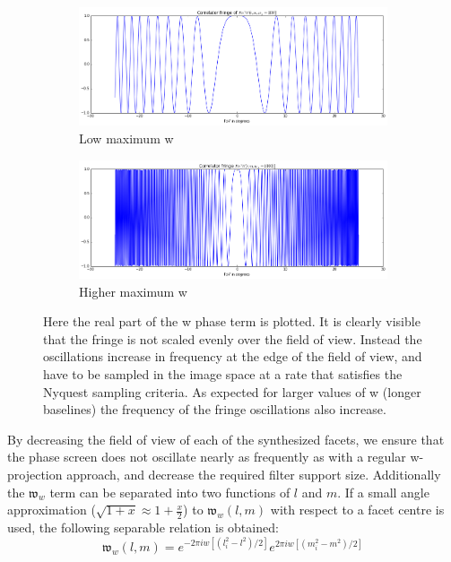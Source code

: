 \begin{figure}[h]
  \begin{mdframed}
    \centering
    \begin{subfigure}[b]{0.7\textwidth}
      \centering
      \includegraphics[width=\textwidth]{images/w_fringe_low_w.png}
      \caption{Low maximum w}
    \end{subfigure}  
    \begin{subfigure}[b]{0.7\textwidth}
      \centering
      \includegraphics[width=\textwidth]{images/w_fringe_high_w.png}
      \caption{Higher maximum w}
    \end{subfigure}
    \caption[w fringe in one dimension]{Here the real part of the w phase term is plotted. It is clearly visible that the fringe is not scaled evenly over the field of view.
	       Instead the oscillations increase in frequency at the edge of the field of view, and have to be sampled in the image space at a rate that
	       satisfies the Nyquest sampling criteria. As expected for larger values of w (longer baselines) the frequency of the fringe oscillations
	       also increase.}
    \label{fig_w_fringes}
  \end{mdframed}
\end{figure}

By decreasing the field of view of each of the synthesized facets, we ensure that the phase screen does not oscillate nearly as frequently as with a regular w-projection approach,
and decrease the required filter support size. Additionally the $\mathfrak{w}_w$ term can be separated into two functions of $l$ and $m$. If a small angle 
approximation ($\sqrt{1+x}\approx1+\frac{x}{2}$) to $\mathfrak{w}_w(l,m)$ with respect to a facet centre is used, the following separable relation is obtained:
\begin{equation}
   \mathfrak{w}_w(l,m) = e^{-2{\pi}iw[(l_i^2-l^2)/2]}e^{2{\pi}iw[(m_i^2-m^2)/2]}
\end{equation}

